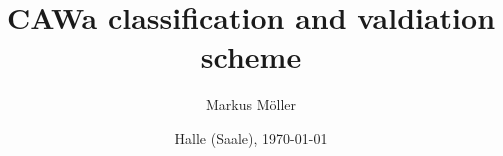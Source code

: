 \begin{titlepage}


\title{CAWa classification and valdiation scheme}
\subject{Report}



\author{Markus M{\"o}ller}
\date{\sffamily Halle (Saale),  \today}
\publishers{Julius  Maximilians  University  W{\"u}rzburg,  Department  of  Remote  Sensing,  Oswald-K{\"u}lpe-Weg  86,  W{\"u}rzburg  97074,  Germany}
\maketitle
\end{titlepage}
